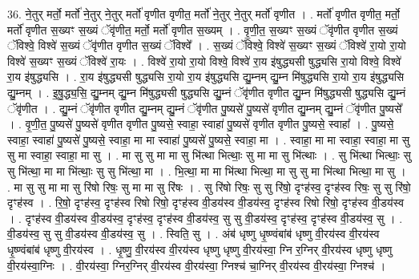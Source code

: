 \documentclass[17pt]{extarticle}
\begin{document}
36. ने॒तुर् मर्तो॒ मर्तो॑ ने॒तुर् ने॒तुर् मर्तो॑ वृणीत वृणीत॒ मर्तो॑ ने॒तुर् ने॒तुर् मर्तो॑ वृणीत । . मर्तो॑ वृणीत वृणीत॒ मर्तो॒ मर्तो॑ वृणीत स॒ख्यꣳ स॒ख्यं ॅवृ॑णीत॒ मर्तो॒ मर्तो॑ वृणीत स॒ख्यम् । . वृ॒णी॒त॒ स॒ख्यꣳ स॒ख्यं ॅवृ॑णीत वृणीत स॒ख्यं ॅविश्वे॒ विश्वे॑ स॒ख्यं ॅवृ॑णीत वृणीत स॒ख्यं ॅविश्वे᳚ । . स॒ख्यं ॅविश्वे॒ विश्वे॑ स॒ख्यꣳ स॒ख्यं ॅविश्वे॑ रा॒यो रा॒यो विश्वे॑ स॒ख्यꣳ स॒ख्यं ॅविश्वे॑ रा॒यः । . विश्वे॑ रा॒यो रा॒यो विश्वे॒ विश्वे॑ रा॒य इ॑षुद्ध्यसी षुद्ध्यसि रा॒यो विश्वे॒ विश्वे॑ रा॒य इ॑षुद्ध्यसि । . रा॒य इ॑षुद्ध्यसी षुद्ध्यसि रा॒यो रा॒य इ॑षुद्ध्यसि द्यु॒म्नम् द्यु॒म्न मि॑षुद्ध्यसि रा॒यो रा॒य इ॑षुद्ध्यसि द्यु॒म्नम् । . इ॒षु॒द्ध्य॒सि॒ द्यु॒म्नम् द्यु॒म्न मि॑षुद्ध्यसी षुद्ध्यसि द्यु॒म्नं ॅवृ॑णीत वृणीत द्यु॒म्न मि॑षुद्ध्यसी षुद्ध्यसि द्यु॒म्नं ॅवृ॑णीत । . द्यु॒म्नं ॅवृ॑णीत वृणीत द्यु॒म्नम् द्यु॒म्नं ॅवृ॑णीत पु॒ष्यसे॑ पु॒ष्यसे॑ वृणीत द्यु॒म्नम् द्यु॒म्नं ॅवृ॑णीत पु॒ष्यसे᳚ । . वृ॒णी॒त॒ पु॒ष्यसे॑ पु॒ष्यसे॑ वृणीत वृणीत पु॒ष्यसे॒ स्वाहा॒ स्वाहा॑ पु॒ष्यसे॑ वृणीत वृणीत पु॒ष्यसे॒ स्वाहा᳚ । . पु॒ष्यसे॒ स्वाहा॒ स्वाहा॑ पु॒ष्यसे॑ पु॒ष्यसे॒ स्वाहा॒ मा मा स्वाहा॑ पु॒ष्यसे॑ पु॒ष्यसे॒ स्वाहा॒ मा । . स्वाहा॒ मा मा स्वाहा॒ स्वाहा॒ मा सु सु मा स्वाहा॒ स्वाहा॒ मा सु । . मा सु सु मा मा सु भि॑त्था भित्थाः॒ सु मा मा सु भि॑त्थाः । . सु भि॑त्था भित्थाः॒ सु सु भि॑त्था॒ मा मा भि॑त्थाः॒ सु सु भि॑त्था॒ मा । . भि॒त्था॒ मा मा भि॑त्था भित्था॒ मा सु सु मा भि॑त्था भित्था॒ मा सु । . मा सु सु मा मा सु रि॑षो रिषः॒ सु मा मा सु रि॑षः । . सु रि॑षो रिषः॒ सु सु रि॑षो॒ दृꣳह॑स्व॒ दृꣳह॑स्व रिषः॒ सु सु रि॑षो॒ दृꣳह॑स्व । . रि॒षो॒ दृꣳह॑स्व॒ दृꣳह॑स्व रिषो रिषो॒ दृꣳह॑स्व वी॒डय॑स्व वी॒डय॑स्व॒ दृꣳह॑स्व रिषो रिषो॒ दृꣳह॑स्व वी॒डय॑स्व । . दृꣳह॑स्व वी॒डय॑स्व वी॒डय॑स्व॒ दृꣳह॑स्व॒ दृꣳह॑स्व वी॒डय॑स्व॒ सु सु वी॒डय॑स्व॒ दृꣳह॑स्व॒ दृꣳह॑स्व वी॒डय॑स्व॒ सु । . वी॒डय॑स्व॒ सु सु वी॒डय॑स्व वी॒डय॑स्व॒ सु । . स्विति॒ सु । . अंब॑ धृष्णु धृ॒ष्ण्वंबांब॑ धृष्णु वी॒रय॑स्व वी॒रय॑स्व धृ॒ष्ण्वंबांब॑ धृष्णु वी॒रय॑स्व । . धृ॒ष्णु॒ वी॒रय॑स्व वी॒रय॑स्व धृष्णु धृष्णु वी॒रय॑स्वा॒ ग्नि र॒ग्निर् वी॒रय॑स्व धृष्णु धृष्णु वी॒रय॑स्वा॒ग्निः । . वी॒रय॑स्वा॒ ग्निर॒ग्निर् वी॒रय॑स्व वी॒रय॑स्वा॒ ग्निश्च॑ चा॒ग्निर् वी॒रय॑स्व वी॒रय॑स्वा॒ ग्निश्च॑ । \newline
\pagebreak
{}
\end{document}
